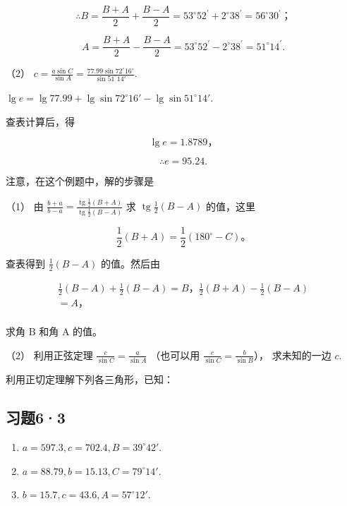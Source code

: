 \[
\therefore B = \frac {B + A}{2} + \frac {B - A}{2} = 53 ^{\circ} 52 ^{\prime} + 2 ^{\circ} 38 ^{\prime} = 56 ^{\circ} 30 ^{\prime}\text{；}
\]

\[
A = \frac {B + A}{2} - \frac {B - A}{2} = 53 ^{\circ} 52 ^{\prime} - 2 ^{\circ} 38 ^{\prime} = 51 ^{\circ} 14 ^{\prime}.
\]

（2）
\(c = \frac{a\sin C}{\sin A} = \frac{77.99\sin 72^{\circ}16'}{\sin 51^{\circ}14'}\).

\(\lg e = \lg 77.99 + \lg \sin 72^{\circ}16' - \lg \sin 51^{\circ}14'\).

查表计算后，得

\[
\lg e = 1.8789\text{，}
\]

\[
\therefore e = 95.24.
\]

注意，在这个例题中，解的步骤是

（1） 由
\(\frac{b + a}{b - a} = \frac{\operatorname{tg} \frac{1}{2}(B + A)}{\operatorname{tg} \frac{1}{2}(B - A)}\)
求 \(\operatorname{tg} \frac{1}{2}(B - A)\) 的值，这里

\[
\frac {1}{2} (B + A) = \frac {1}{2} (180 ^{\circ} - C)\text{。}
\]

查表得到 \(\frac{1}{2} (B - A)\) 的值。然后由

\[
\begin{array}{l} \frac {1}{2} (B - A) + \frac {1}{2} (B - A) = B\text{，} \frac {1}{2} (B + A) - \frac {1}{2} (B - A) \\ = A\text{，} \\ \end{array}
\]

求角 B 和角 A 的值。

（2） 利用正弦定理 \(\frac{c}{\sin C} = \frac{a}{\sin A}\) （也可以用
\(\frac{c}{\sin C} = \frac{b}{\sin B}\)）， 求未知的一边 \(c\).

利用正切定理解下列各三角形，已知：

\subsection{习题6·3}

\begin{enumerate}
\item
  \(a = 597.3, c = 702.4, B = 39^{\circ}42'\).
\item
  \(a = 88.79, b = 15.13, C = 79^{\circ}14'\).
\item
  \(b = 15.7, c = 43.6, A = 57^{\circ}12'\).
\end{enumerate}

